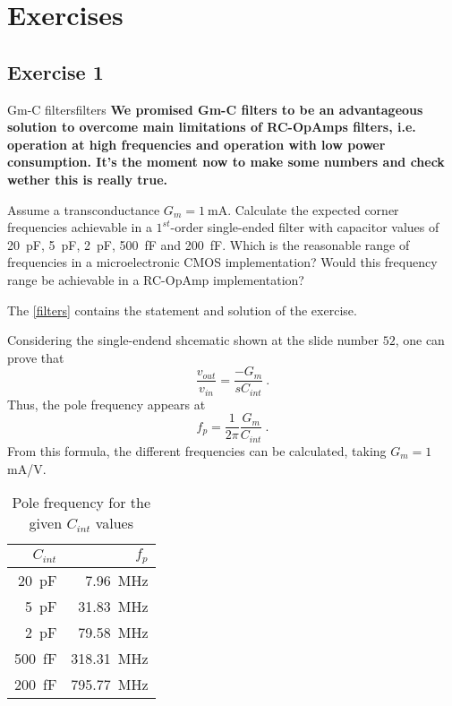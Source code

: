 

\chapter{Exercises}

\section{Exercise 1}

\begin{exbox}{Gm-C filters}{filters}
	\bfseries
We promised Gm-C filters to be an advantageous solution to overcome main limitations of RC-OpAmps filters, i.e. operation at high frequencies and operation with low power consumption. It's the moment now to make some numbers and check wether this is really true.

Assume a transconductance $G_m = \SI{1}{\mA}$. Calculate the expected corner frequencies achievable in a $1^{st}$-order single-ended filter with capacitor values of \SI{20}{\pF}, \SI{5}{\pF}, \SI{2}{\pF}, \SI{500}{\fF} and \SI{200}{\fF}. Which is the reasonable range of frequencies in a microelectronic CMOS implementation? Would this frequency range be achievable in a RC-OpAmp implementation?
\end{exbox}

The \cref{filters} contains the statement and solution of the exercise.

Considering the single-endend shcematic shown at the slide number $52$, one can prove that 
\begin{equation}
   \frac{v_{out}}{v_{in}} = \frac{ - G_m }{s C_{int}} \ .
\end{equation}
Thus, the pole frequency appears at 
\begin{equation}
   f_p = \frac{1}{2 \pi} \frac{G_{m}}{C_{int}} \ .
\end{equation}
From this formula, the different frequencies can be calculated, taking $G_{m} = 1$ mA/V.
\begin{table}[H] \centering
   \begin{tabular}{ |r|r| } \hline
	   $C_{int}$ & $f_p$  \\ \hline \hline
	   \SI{20}{\pF} & \SI{7.96}{\MHz} \\ \hline
	   \SI{5}{\pF} & \SI{31.83}{\MHz} \\ \hline
	   \SI{2}{\pF} & \SI{79.58}{\MHz} \\ \hline
	   \SI{500}{\fF} & \SI{318.31}{\MHz} \\ \hline
	   \SI{200}{\fF} & \SI{795.77}{\MHz} \\ \hline
   \end{tabular}
   \caption{Pole frequency for the given $C_{int}$ values}
\end{table}


